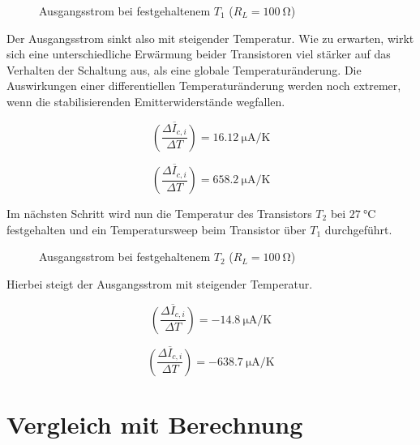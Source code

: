 \begin{figure}[H]
	\centering \small
	\scalebox{0.8}{}
	\caption{Ausgangsstrom bei festgehaltenem $T_1$ ($R_L = \SI{100}{\ohm}$)}
	\label{fig_Kap4_08:diffT_1}
\end{figure}

Der Ausgangsstrom sinkt also mit steigender Temperatur. Wie zu erwarten, wirkt sich eine unterschiedliche Erwärmung beider Transistoren viel stärker auf das Verhalten der Schaltung aus, als eine globale Temperaturänderung. Die Auswirkungen einer differentiellen Temperaturänderung werden noch extremer, wenn die stabilisierenden Emitterwiderstände wegfallen.

\begin{equation}
    \overline{\left({\frac{\Delta I_{c,i}}{\Delta T}}\right)} = \SI{16.12}{\micro\ampere\per\kelvin}
\end{equation}

\begin{equation}
    \overline{\left({\frac{\Delta I_{c,i}}{\Delta T}}\right)} = \SI{658.2}{\micro\ampere\per\kelvin}
\end{equation}

Im nächsten Schritt wird nun die Temperatur des Transistors $T_2$ bei $\SI{27}{\celsius}$ festgehalten und ein Temperatursweep beim Transistor über $T_1$ durchgeführt.

\begin{figure}[H]
	\centering \small
	\scalebox{0.8}{}
	\caption{Ausgangsstrom bei festgehaltenem $T_2$ ($R_L = \SI{100}{\ohm}$)}
	\label{fig_Kap4_09:diffT_1}
\end{figure}

Hierbei steigt der Ausgangsstrom mit steigender Temperatur.

\begin{equation}
    \overline{\left({\frac{\Delta I_{c,i}}{\Delta T}}\right)} = -\SI{14.8}{\micro\ampere\per\kelvin}
\end{equation}

\begin{equation}
    \overline{\left({\frac{\Delta I_{c,i}}{\Delta T}}\right)} = -\SI{638.7}{\micro\ampere\per\kelvin}
\end{equation}



\section{Vergleich mit Berechnung}

